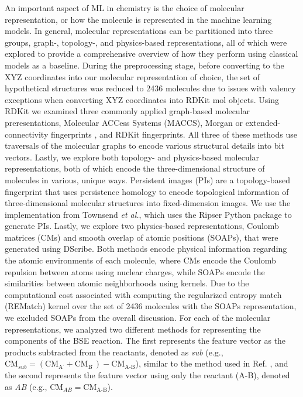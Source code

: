 \documentclass[journal=jacsat,manuscript=article]{achemso}
\begin{document}
An important aspect of ML in chemistry is the choice of molecular representation, or how the molecule is represented in the machine learning models.\cite{jones_molecular_2023}
In general, molecular representations can be partitioned into three groups, graph-, topology-, and physics-based representations, all of which were explored to provide a comprehensive overview of how they perform using classical models as a baseline.
During the preprocessing stage, before converting to the XYZ coordinates into our molecular representation of choice, the set of hypothetical structures was reduced to 2436 molecules due to issues with valency exceptions when converting XYZ coordinates into RDKit mol objects.
Using RDKit\cite{noauthor_rdkit_nodate} we examined three commonly applied graph-based molecular preresentations, Molecular ACCess Systems (MACCS)\cite{durant_reoptimization_2002}, Morgan or extended-connectivity fingerprints \cite{morgan_generation_1965,rogers_extended-connectivity_2010}, and RDKit fingerprints.
All three of these methods use traversals of the molecular graphs to encode various structural details into bit vectors.
Lastly, we explore both topology- and physics-based molecular representations, both of which encode the three-dimensional structure of molecules in various, unique ways.
Persistent images (PIs) are a topology-based fingerprint that uses persistence homology to encode topological information of three-dimensional molecular structures into fixed-dimension images.\cite{adams_persistence_2017,townsend_representation_2020,schiff_augmenting_2022} 
We use the implementation from Townsend \textit{et al.}\cite{townsend_representation_2020}, which uses the Ripser Python package to generate PIs.\cite{tralie_ripserpy_2018}
Lastly, we explore two physics-based representations, Coulomb matrices (CMs) \cite{rupp_fast_2012} and smooth overlap of atomic positions (SOAPs), that were generated using DScribe.\cite{de_comparing_2016}
Both methods encode physical information regarding the atomic environments of each molecule, where CMs encode the Coulomb repulsion between atoms using nuclear charges, while SOAPs encode the similarities between atomic neighborhoods using kernels.
Due to the computational cost associated with computing the regularized entropy match (REMatch) kernel over the set of 2436 molecules with the SOAPs representation, we excluded SOAPs from the overall discussion.
For each of the molecular representations, we analyzed two different methods for representing the components of the BSE reaction.
The first represents the feature vector as the products subtracted from the reactants, denoted as \textit{sub} (e.g., $\text{CM}_{\mathit{sub}} = (\text{CM}_{\text{A}^{.}} + \text{CM}_{\text{B}^{.}}) - \text{CM}_{\text{A-B}}$), similar to the method used in Ref. \cite{garcia-andrade_barrier_2023}, and the second represents the feature vector using only the reactant (A-B), denoted as \textit{AB} (e.g., $\text{CM}_{\mathit{AB}} =  \text{CM}_{\text{A-B}}$).
\end{document}
